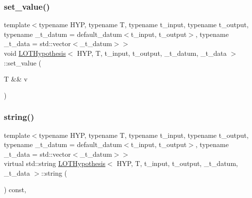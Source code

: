 \mbox{\label{class_l_o_t_hypothesis_ac07e0957d2e586f2cc84821795d5c462}} 
\subsubsection{\texorpdfstring{set\+\_\+value()}{set\_value()}\hspace{0.1cm}{\footnotesize\ttfamily [2/2]}}
{\footnotesize\ttfamily template$<$typename H\+YP, typename T, typename t\+\_\+input, typename t\+\_\+output, typename \+\_\+t\+\_\+datum = default\+\_\+datum$<$t\+\_\+input, t\+\_\+output$>$, typename \+\_\+t\+\_\+data = std\+::vector$<$\+\_\+t\+\_\+datum$>$$>$ \\
void \hyperlink{class_l_o_t_hypothesis}{L\+O\+T\+Hypothesis}$<$ H\+YP, T, t\+\_\+input, t\+\_\+output, \+\_\+t\+\_\+datum, \+\_\+t\+\_\+data $>$\+::set\+\_\+value (\begin{DoxyParamCaption}\item[{T \&\&}]{v }\end{DoxyParamCaption})\hspace{0.3cm}{\ttfamily [inline]}}

\mbox{\label{class_l_o_t_hypothesis_a0a82849305c4718f4406f7a8c13fbfa7}} 
\subsubsection{\texorpdfstring{string()}{string()}}
{\footnotesize\ttfamily template$<$typename H\+YP, typename T, typename t\+\_\+input, typename t\+\_\+output, typename \+\_\+t\+\_\+datum = default\+\_\+datum$<$t\+\_\+input, t\+\_\+output$>$, typename \+\_\+t\+\_\+data = std\+::vector$<$\+\_\+t\+\_\+datum$>$$>$ \\
virtual std\+::string \hyperlink{class_l_o_t_hypothesis}{L\+O\+T\+Hypothesis}$<$ H\+YP, T, t\+\_\+input, t\+\_\+output, \+\_\+t\+\_\+datum, \+\_\+t\+\_\+data $>$\+::string (\begin{DoxyParamCaption}{ }\end{DoxyParamCaption}) const\hspace{0.3cm}{\ttfamily [inline]}, {\ttfamily [virtual]}}



